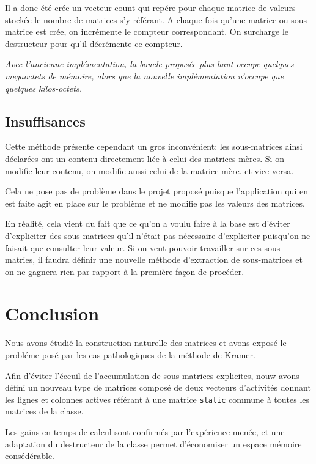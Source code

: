 \documentclass[a4paper,11pt]{article}
\newenvironment{remarque}%
{\description\item[Remarque.]\sl}%
{\enddescription}
\begin{document}
Il a donc été crée un vecteur count qui repére pour chaque matrice de valeurs stockée le nombre de matrices s'y référant. A chaque fois qu'une matrice ou sous-matrice est crée, on incrémente le compteur correspondant. On surcharge le destructeur pour qu'il décrémente ce compteur.

\begin{remarque}
  Avec l'ancienne implémentation, la boucle proposée plus haut occupe quelques megaoctets de mémoire, alors que la nouvelle implémentation n'occupe que quelques kilos-octets.
\end{remarque}

\subsection{Insuffisances}

Cette méthode présente cependant un gros inconvénient: les sous-matrices ainsi déclarées ont un contenu directement liée à celui des matrices mères. Si on modifie leur contenu, on modifie aussi celui de la matrice mère. et vice-versa.

Cela ne pose pas de problème dans le projet proposé puisque l'application qui en est faite agit en place sur le problème et ne modifie pas les valeurs des matrices.

En réalité, cela vient du fait que ce qu'on a voulu faire à la base est d'éviter d'expliciter des sous-matrices qu'il n'était pas nécessaire d'expliciter puisqu'on ne faisait que consulter leur valeur. Si on veut pouvoir travailler sur ces sous-matries, il faudra définir une nouvelle méthode d'extraction de sous-matrices et on ne gagnera rien par rapport à la première façon de procéder.

\section*{Conclusion}

Nous avons étudié la construction naturelle des matrices et avons exposé le probléme posé par les cas pathologiques de la méthode de Kramer.

Afin d'éviter l'éceuil de l'accumulation de sous-matrices explicites, nouw avons défini un nouveau type de matrices composé de deux vecteurs d'activités donnant les lignes et colonnes actives référant à une matrice \texttt{static} commune à toutes les matrices de la classe.

Les gains en temps de calcul sont confirmés par l'expérience menée, et une adaptation du destructeur de la classe permet d'économiser un espace mémoire consédérable. 
\end{document}
